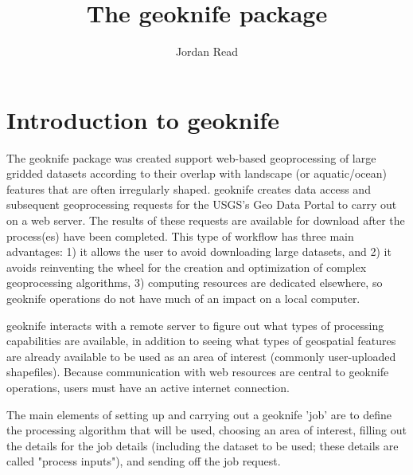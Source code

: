 \documentclass[a4paper,11pt]{article}\usepackage[]{graphicx}\usepackage[]{color}
\begin{document}
\renewenvironment{knitrout}{\begin{singlespace}}{\end{singlespace}}
\renewcommand*\listfigurename{Figures}
\renewcommand*\listtablename{Tables}




\title{The geoknife package}
\author[1]{Jordan Read}





\maketitle
\tableofcontents

\section{Introduction to geoknife}
The geoknife package was created support web-based geoprocessing of large gridded datasets according to their overlap with landscape (or aquatic/ocean) features that are often irregularly shaped. geoknife creates data access and subsequent geoprocessing requests for the USGS's Geo Data Portal to carry out on a web server. The results of these requests are available for download after the process(es) have been completed. This type of workflow has three main advantages: 1) it allows the user to avoid downloading large datasets, and 2) it avoids reinventing the wheel for the creation and optimization of complex geoprocessing algorithms, 3) computing resources are dedicated elsewhere, so geoknife operations do not have much of an impact on a local computer. 

geoknife interacts with a remote server to figure out what types of processing capabilities are available, in addition to seeing what types of geospatial features are already available to be used as an area of interest (commonly user-uploaded shapefiles). Because communication with web resources are central to geoknife operations, users must have an active internet connection. 

The main elements of setting up and carrying out a geoknife 'job' are to define the processing algorithm that will be used, choosing an area of interest, filling out the details for the job details (including the dataset to be used; these details are called "process inputs"), and sending off the job request. 
\end{document}
